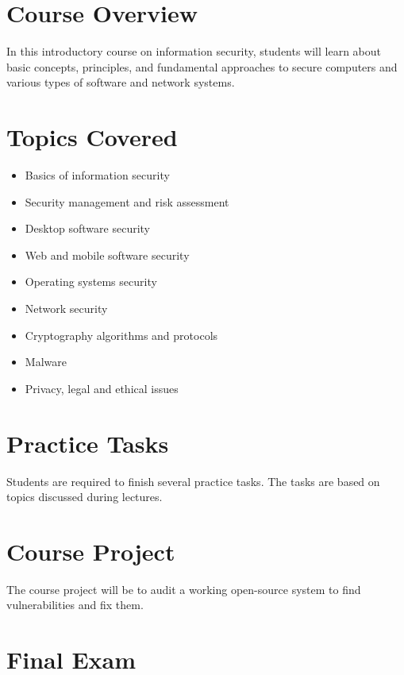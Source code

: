 \documentclass[12pt,a4paper,oneside]{article}
\begin{document}
    \section{Course Overview}
    
	In this introductory course on information security, students will learn about basic concepts, principles, and fundamental approaches to secure computers and various types of software and network systems.

    \section{Topics Covered}

        \begin{itemize}
        	\item Basics of information security
            \item Security management and risk assessment
            \item Desktop software security
            \item Web and mobile software security
            \item Operating systems security
            \item Network security
            \item Cryptography algorithms and protocols 
            \item Malware
            \item Privacy, legal and ethical issues
        \end{itemize}

    \section{Practice Tasks}

        Students are required to finish several practice tasks. The tasks are based
        on topics discussed during lectures.

    \section{Course Project}

        The course project will be to audit a working open-source system to find vulnerabilities and fix them. 

    \section{Final Exam}
\end{document}
